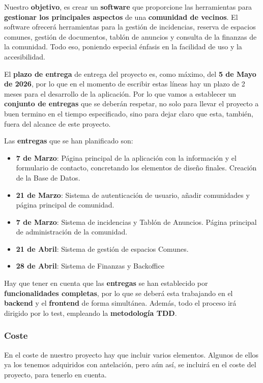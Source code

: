 Nuestro \textbf{objetivo}, es crear un \textbf{software} que proporcione las herramientas para \textbf{gestionar los principales aspectos} de una \textbf{comunidad de vecinos}. El software ofrecerá herramientas para la gestión de incidencias, reserva de espacios comunes, gestión de documentos, tablón de anuncios y consulta de la finanzas de la comunidad. Todo eso, poniendo especial énfasis en la facilidad de uso y la accesibilidad.

El \textbf{plazo de entrega} de entrega del proyecto es, como máximo, del \textbf{5 de Mayo de 2026}, por lo que en el momento de escribir estas líneas hay un plazo de 2 meses para el desarrollo de la aplicación. Por lo que vamos a establecer un \textbf{conjunto de entregas} que se deberán respetar, no solo para llevar el proyecto a buen termino en el tiempo especificado, sino para dejar claro que esta, también, fuera del alcance de este proyecto.

Las \textbf{entregas} que se han planificado son:

\begin{itemize}
	\item \textbf{7 de Marzo}: Página principal de la aplicación con la información y el formulario de contacto, concretando los elementos de diseño finales. Creación de la Base de Datos.
	
	\item \textbf{21 de Marzo}: Sistema de autenticación de usuario, añadir comunidades y página principal de comunidad. 
	
	\item \textbf{7 de Marzo}: Sistema de incidencias y Tablón de Anuncios. Página principal de administración de la comunidad.
	
	\item \textbf{21 de Abril}:  Sistema de gestión de espacios Comunes.
	
	\item \textbf{28 de Abril}: Sistema de Finanzas y Backoffice
\end{itemize}

Hay que tener en cuenta que las \textbf{entregas} se han establecido por \textbf{funcionalidades completas}, por lo que se deberá esta trabajando en el \textbf{backend} y el \textbf{frontend} de forma simultánea. Además, todo el proceso irá dirigido por lo test, empleando la \textbf{metodología TDD}.

\subsubsection{Coste}
En el coste de nuestro proyecto hay que incluir varios elementos. Algunos de ellos ya los tenemos adquiridos con antelación, pero aún así, se incluirá en el coste del proyecto, para tenerlo en cuenta.


